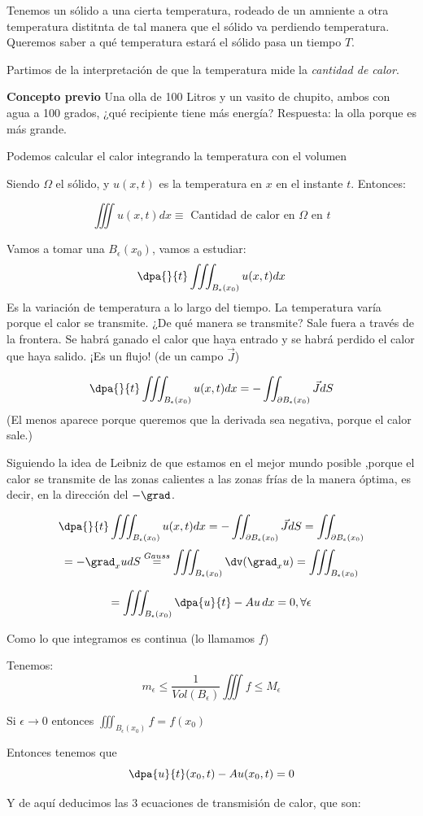 \begin{example}
Tenemos un sólido a una cierta temperatura, rodeado de un amniente a otra temperatura distitnta de tal manera que el sólido va perdiendo temperatura. Queremos saber a qué temperatura estará el sólido pasa un tiempo $T$.

Partimos de la interpretación de que la temperatura mide la \emph{cantidad de calor}. 

\textbf{Concepto previo} Una olla de 100 Litros y un vasito de chupito, ambos con agua a 100 grados, ¿qué recipiente tiene más energía? Respuesta: la olla porque es más grande.

Podemos calcular el calor integrando la temperatura con el volumen


Siendo $\Omega$ el sólido, y $u(x,t)$ es la temperatura en $x$ en el instante $t$. Entonces:

\[\iiint u(x,t) dx \equiv \text{ Cantidad de calor en }\Omega\text{ en }t\]

Vamos a tomar una $B_{\epsilon}(x_0)$, vamos a estudiar:
\[\dpa{}{t} \iiint_{B_{\epsilon}(x_0)} u(x,t)dx\]
 Es la variación de temperatura a lo largo del tiempo. La temperatura varía porque el calor se transmite. ¿De qué manera se transmite? Sale fuera a través de la frontera. Se habrá ganado el calor que haya entrado y se habrá perdido el calor que haya salido. ¡Es un flujo!
 (de un campo $\vec{J}$)
  
 \[\dpa{}{t} \iiint_{B_{\epsilon}(x_0)} u(x,t)dx = -\iint_{\partial B_{\epsilon}(x_0)} \vec{J}dS\]
 (El menos aparece porque queremos que la derivada sea negativa, porque el calor sale.)
 
 
 Siguiendo la idea de Leibniz de que estamos en el mejor mundo posible ,porque el calor se transmite de las zonas calientes a las zonas frías de la manera óptima, es decir, en la dirección del $-\grad$.
 
 
 \[\dpa{}{t} \iiint_{B_{\epsilon}(x_0)} u(x,t)dx = -\iint_{\partial B_{\epsilon}(x_0)} \vec{J}dS = \iint_{\partial B_{\epsilon}(x_0)}\]
 \[ = -\grad_x u dS \stackrel{Gauss}{=} \iiint_{B_{\epsilon}(x_0)} \dv(\grad_x u) = \iiint_{B_{\epsilon}(x_0)}  \]

\[ = \iiint_{B_{\epsilon}(x_0)} \dpa{u}{t}-Au\,dx=0,\forall \epsilon\]

Como lo que integramos es continua (lo llamamos $f$)

Tenemos:
\[m_{\epsilon} \leq \frac{1}{Vol(B_{\epsilon})} \iiint f \leq M_{\epsilon}\] 

Si $\epsilon \to 0$ entonces $\displaystyle\iiint_{B_{\epsilon}(x_0)} f = f(x_0)$

Entonces tenemos que \[\dpa{u}{t}(x_0,t) - Au(x_0,t) = 0\]

Y de aquí deducimos las 3 ecuaciones de transmisión de calor, que son: 
 \end{example}

